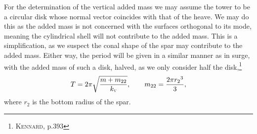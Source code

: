 For the determination of the vertical added mass we may assume the tower to be a circular disk whose normal vector coincides with that of the heave.
We may do this as the added mass is not concerned with the surfaces orthogonal to its mode, meaning the cylindrical shell will not contribute to the added mass.
This is a simplification, as we suspect the conal shape of the spar may contribute to the added mass.
Either way, the period will be given in a similar manner as in surge, with the added mass of such a disk, halved, as we only consider half the disk,\footnote{\cite{irrotational1967kennard} \textsc{Kennard}, p.393}
\[
    T = 2\pi \sqrt{\frac{m + m_{22}}{k_{\textsc{v}}}}, \qquad m_{22} = \frac{2 \pi {r_2}^3}{3},
\]
where $r_2$ is the bottom radius of the spar.
